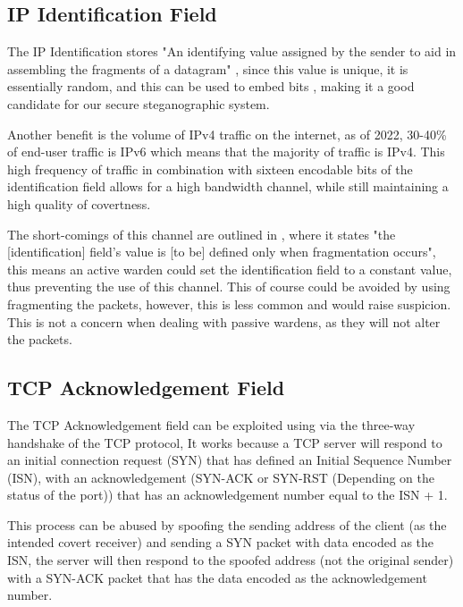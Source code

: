 \subsection{IP Identification Field}

The IP Identification stores "An identifying value assigned by the sender to aid in assembling the fragments of a datagram" \cite{rfc791}, since this value is unique, it is essentially random, and this can be used to embed bits \cite{EoIICCA}, making it a good candidate for our secure steganographic system.

Another benefit is the volume of IPv4 traffic on the internet, as of 2022, 30-40\% of end-user traffic is IPv6 \cite{I10YO} which means that the majority of traffic is IPv4. This high frequency of traffic in combination with sixteen encodable bits of the identification field allows for a high bandwidth channel, while still maintaining a high quality of covertness.

The short-comings of this channel are outlined in \cite{rfc6864}, where it states "the [identification] field's value is [to be] defined only when fragmentation occurs", this means an active warden could set the identification field to a constant value, thus preventing the use of this channel. This of course could be avoided by using fragmenting the packets, however, this is less common and would raise suspicion. This is not a concern when dealing with passive wardens, as they will not alter the packets.

\subsection{TCP Acknowledgement Field}

The TCP Acknowledgement field can be exploited using via the three-way handshake of the TCP protocol, It works because a TCP server will respond to an initial connection request (SYN) that has defined an Initial Sequence Number (ISN), with an acknowledgement (SYN-ACK or SYN-RST (Depending on the status of the port)) that has an acknowledgement number equal to the ISN + 1.

This process can be abused by spoofing the sending address of the client (as the intended covert receiver) and sending a SYN packet with data encoded as the ISN, the server will then respond to the spoofed address (not the original sender) with a SYN-ACK packet that has the data encoded as the acknowledgement number. \cite{CCitTCPIPPS}

